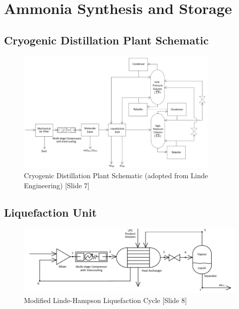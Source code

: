 \documentclass[11pt, oneside]{article}
\begin{document}
\section{Ammonia Synthesis and Storage}

    \subsection{Cryogenic Distillation Plant Schematic}
    \begin{figure}[ht]
        \centering
        \includegraphics[width=0.87\textwidth]{airseparation/handouts/graphics/plant_diagram.jpg}
        \caption{Cryogenic Distillation Plant Schematic (adopted from Linde Engineering) [Slide 7]}
        \label{fig:plant_schematic}
    \end{figure}
    
    \subsection{Liquefaction Unit}
    \begin{figure}[ht]
        \centering
        \includegraphics[width=1.1\textwidth]{airseparation/handouts/graphics/labelled_liquefier_diagram.jpg}
        \caption{Modified Linde-Hampson Liquefaction Cycle [Slide 8]}
        \label{fig:liquefier}
    \end{figure}
    
    \newpage
    
\end{document}
